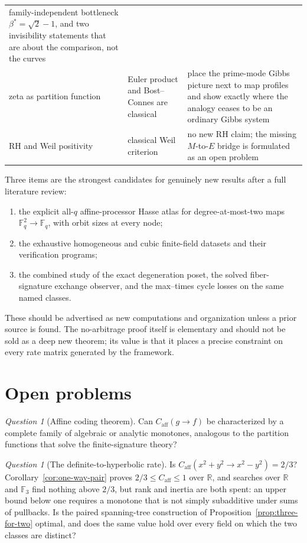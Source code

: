 \documentclass[11pt]{article}
\theoremstyle{definition}
\theoremstyle{plain}
\theoremstyle{remark}
\newtheorem{question}[definition]{Question}
\newcommand{\F}{\mathbb F}
\newcommand{\R}{\mathbb R}
\newcommand{\caff}{C_{\mathrm{aff}}}
\begin{document}
\begin{center}
\begin{tabular}{@{}p{}p{}p{}@{}}
family-independent bottleneck \(\beta^*=\sqrt2-1\), and two invisibility
statements that are about the comparison, not the curves\\[2pt]
zeta as partition function & Euler product and Bost--Connes are classical &
place the prime-mode Gibbs picture next to map profiles and show exactly where
the analogy ceases to be an ordinary Gibbs system\\[2pt]
RH and Weil positivity & classical Weil criterion & no new RH claim; the
missing \(M\)-to-\(E\) bridge is formulated as an open problem\\
\bottomrule
\end{tabular}
\end{center}

Three items are the strongest candidates for genuinely new results after a
full literature review:
\begin{enumerate}
  \item the explicit all-\(q\) affine-processor Hasse atlas for
  degree-at-most-two maps \(\F_q^2\to\F_q\), with orbit sizes at every node;
  \item the exhaustive homogeneous and cubic finite-field datasets and their
  verification programs;
  \item the combined study of the exact degeneration poset, the solved
  fiber-signature exchange observer, and the max--times cycle losses on the
  same named classes.
\end{enumerate}
These should be advertised as new computations and organization unless a
prior source is found.  The no-arbitrage proof itself is elementary and should
not be sold as a deep new theorem; its value is that it places a precise
constraint on every rate matrix generated by the framework.

\section{Open problems}

\begin{question}[Affine coding theorem]
Can \(\caff(g\to f)\) be characterized by a complete family of algebraic or
analytic monotones, analogous to the partition functions that solve the
finite-signature theory?
\end{question}

\begin{question}[The definite-to-hyperbolic rate]
\label{q:definite-hyperbolic}
Is \(\caff(x^2+y^2\to x^2-y^2)=2/3\)?  Corollary~\ref{cor:one-way-pair}
proves \(2/3\le\caff\le1\) over \(\R\), and searches over \(\R\) and
\(\F_3\) find nothing above \(2/3\), but rank and inertia are both spent:
an upper bound below one requires a monotone that is not simply subadditive
under sums of pullbacks.  Is the paired spanning-tree construction of
Proposition~\ref{prop:three-for-two} optimal, and does the same value hold
over every field on which the two classes are distinct?
\end{question}
\end{document}
